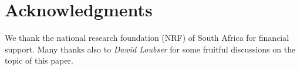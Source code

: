\section{Acknowledgments}
We thank the national research foundation (NRF) of South Africa for financial support. Many thanks also to {\it Dawid Loubser} for some fruitful discussions on the topic of this paper.
